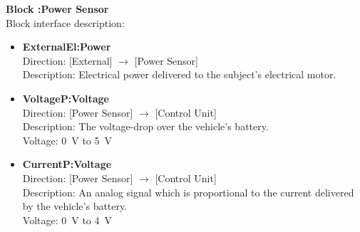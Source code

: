 \textbf{Block :Power Sensor}\\
Block interface description:
\begin{itemize}
	\item \textbf{ExternalEl:Power}\\
	Direction: [External] $\rightarrow$ [Power Sensor]\\
	Description: Electrical power delivered to the subject's electrical motor.
	\item \textbf{VoltageP:Voltage}\\
	Direction: [Power Sensor] $\rightarrow$ [Control Unit]\\
	Description: The voltage-drop over the vehicle's battery.\\
	Voltage: \SI{0}{\volt} to \SI{5}{\volt}
	\item \textbf{CurrentP:Voltage}\\
	Direction: [Power Sensor] $\rightarrow$ [Control Unit]\\
	Description: An analog signal which is proportional to the current delivered by the vehicle's battery.\\
	Voltage: \SI{0}{\volt} to \SI{4}{\volt}
\end{itemize}
									

